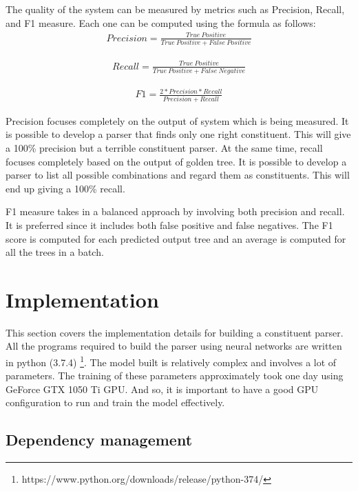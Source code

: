 \documentclass[a4paper, 11pt]{article}
\begin{document}
The quality of the system can be measured by metrics such as Precision, Recall, and F1 measure. Each one can be computed using the formula as follows:
\begin{align*}
Precision = \frac{True\ Positive} {True\ Positive + False\ Positive}
\end{align*}

\begin{align*}
Recall = \frac{True\ Positive} {True\ Positive + False\ Negative}
\end{align*}

\begin{align*}
F1 = \frac{2* Precision * Recall} {Precision + Recall}
\end{align*}

Precision focuses completely on the output of system which is being measured. It is possible to develop a parser that finds only one right constituent. This will give a 100\% precision but a terrible constituent parser. At the same time, recall focuses completely based on the output of golden tree. It is possible to develop a parser to list all possible combinations and regard them as constituents. This will end up giving a 100\% recall.

F1 measure takes in a balanced approach by involving both precision and recall. It is preferred since it includes both false positive and false negatives. The F1 score is computed for each predicted output tree and an average is computed for all the trees in a batch. 


\pagebreak
\section{Implementation}

This section covers the implementation details for building a constituent parser. All the programs required to build the parser using neural networks are written in python (3.7.4) \footnote{https://www.python.org/downloads/release/python-374/}. The model built is relatively complex and involves a lot of parameters. The training of these parameters approximately took one day using GeForce GTX 1050 Ti GPU. And so, it is important to have a good GPU configuration to run and train the model effectively. 
\subsection{Dependency management}
\end{document}
